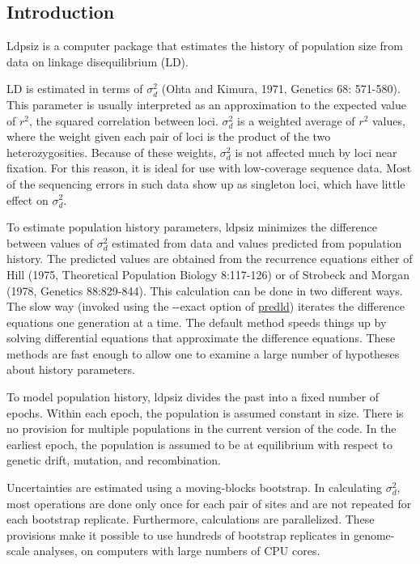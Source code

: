 \hypertarget{index_mainpage}{}\subsection{Introduction}\label{index_mainpage}
Ldpsiz is a computer package that estimates the history of population size from data on linkage disequilibrium (L\-D).

L\-D is estimated in terms of $\sigma_d^2$ (Ohta and Kimura, 1971, Genetics 68\-: 571-\/580). This parameter is usually interpreted as an approximation to the expected value of $r^2$, the squared correlation between loci. $\sigma_d^2$ is a weighted average of $r^2$ values, where the weight given each pair of loci is the product of the two heterozygosities. Because of these weights, $\sigma_d^2$ is not affected much by loci near fixation. For this reason, it is ideal for use with low-\/coverage sequence data. Most of the sequencing errors in such data show up as singleton loci, which have little effect on $\sigma_d^2$.

To estimate population history parameters, {\ttfamily ldpsiz} minimizes the difference between values of $\sigma_d^2$ estimated from data and values predicted from population history. The predicted values are obtained from the recurrence equations either of Hill (1975, Theoretical Population Biology 8\-:117-\/126) or of Strobeck and Morgan (1978, Genetics 88\-:829-\/844). This calculation can be done in two different ways. The slow way (invoked using the {\ttfamily -\/-\/exact} option of \hyperlink{predld_8c_predld}{predld}) iterates the difference equations one generation at a time. The default method speeds things up by solving differential equations that approximate the difference equations. These methods are fast enough to allow one to examine a large number of hypotheses about history parameters.

To model population history, {\ttfamily ldpsiz} divides the past into a fixed number of epochs. Within each epoch, the population is assumed constant in size. There is no provision for multiple populations in the current version of the code. In the earliest epoch, the population is assumed to be at equilibrium with respect to genetic drift, mutation, and recombination.

Uncertainties are estimated using a moving-\/blocks bootstrap. In calculating $\sigma_d^2$, most operations are done only once for each pair of sites and are not repeated for each bootstrap replicate. Furthermore, calculations are parallelized. These provisions make it possible to use hundreds of bootstrap replicates in genome-\/scale analyses, on computers with large numbers of C\-P\-U cores.


